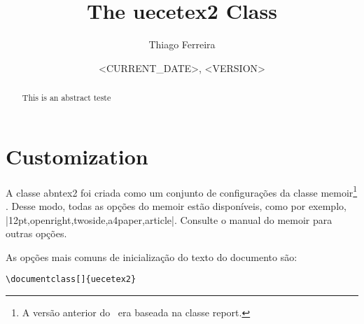 \documentclass[letterpaper]{ltxdoc}
\title{The \textsf{uecetex2} Class}
\author{Thiago Ferreira}
\date{<CURRENT_DATE>, <VERSION>}
\begin{document}
\maketitle

\begin{abstract}
    This is an abstract teste
\end{abstract}

\tableofcontents

\section{Customization}

\DescribeMacro{\documentclass}
A classe \textsf{abntex2} foi criada como um conjunto de configurações da classe
\textsf{memoir}\footnote{A versão anterior do ~era baseada na classe
\textsf{report}.} \cite{memoir}. Desse modo, todas as opções do \textsf{memoir}
estão disponíveis, como por exemplo, |12pt,openright,twoside,a4paper,article|.
Consulte o manual do \textsf{memoir} para outras opções.

As opções mais comuns de inicialização do texto do documento são:

\begin{verbatim}
\documentclass[]{uecetex2}
\end{verbatim}
\end{document}
